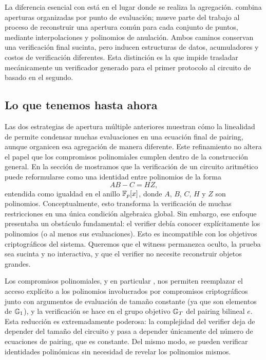 La diferencia esencial con \GWCNineteen está en el lugar donde se realiza la agregación. \GWCNineteen combina aperturas \KZG organizadas por punto de evaluación; \HaloTwoMultiOpen mueve parte del trabajo al proceso de reconstruir una apertura común para cada conjunto de puntos, mediante interpolaciones y polinomios de anulación. Ambos caminos conservan una verificación final sucinta, pero inducen estructuras de datos, acumuladores y costos de verificación diferentes. Esta distinción es la que impide trasladar mecánicamente un verificador generado para el primer protocolo al circuito de \Mithril basado en el segundo.

\subsection{Lo que tenemos hasta ahora}
\label{subsec:apendice-b-kzg-lo-que-tenemos-hasta-ahora}

Las dos estrategias de apertura múltiple anteriores muestran cómo la linealidad de \KZG permite condensar muchas evaluaciones en una ecuación final de pairing, aunque organicen esa agregación de manera diferente. Este refinamiento no altera el papel que los compromisos polinomiales cumplen dentro de la construcción general. En la sección de \QAP mostramos que la verificación de un circuito aritmético puede reformularse como una identidad entre polinomios de la forma
$$AB - C = HZ,$$
entendida como igualdad en el anillo $\mathbb{F}_p[x]$, donde $A$, $B$, $C$, $H$ y $Z$ son polinomios. Conceptualmente, esto transforma la verificación de muchas restricciones en una única condición algebraica global. Sin embargo, ese enfoque presentaba un obstáculo fundamental: el verifier debía conocer explícitamente los polinomios (o al menos sus evaluaciones). Esto es incompatible con los objetivos criptográficos del sistema. Queremos que el witness permanezca oculto, la prueba sea sucinta y no interactiva, y que el verifier no necesite reconstruir objetos grandes.


Los compromisos polinomiales, y en particular \KZG, nos permiten reemplazar el acceso explícito a los polinomios involucrados por compromisos criptográficos junto con argumentos de evaluación de tamaño constante (ya que son elementos de $\mathbb{G}_1$), y la verificación se hace en el grupo objetivo $\mathbb{G}_T$ del pairing bilineal $e$. Esta reducción es extremadamente poderosa: la complejidad del verifier deja de depender del tamaño del circuito y pasa a depender únicamente del número de ecuaciones de pairing, que es constante. Del mismo modo, se pueden verificar identidades polinómicas sin necesidad de revelar los polinomios mismos.

